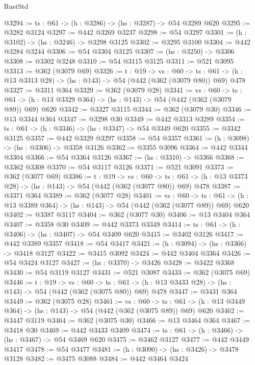 \begin{lexlean}{RustStd}
\begin{coremodule}
@3294 := {ts : @61} -> (h : @3286) -> (hs : @3287) -> @54 @3289 @620
@3295 := @3282 @3124
@3297 := @442 @3269 @3237
@3298 := @54 @3297
@3301 := (h : @3102) -> (hs : @3246) -> @3298 @3125
@3302 := @3295 @3100
@3304 := @442 @3284 @3244
@3306 := @54 @3304 @3125
@3307 := (hs : @3250) -> @3306
@3308 := @3302 @3248
@3310 := @54 @3115 @3125
@3311 := @521 @3095
@3313 := @362 (@3079 @69)
@3326 := {t : @19} ->
  {vs : @60} ->
  {ts : @61} -> (h : @13 @3313 @28) -> (hs : @143) -> @54 (@442 (@362 (@3079 @80)) @69) @478
@3327 := @3311 @364
@3329 := @362 (@3079 @28)
@3341 := {vs : @60} ->
  {ts : @61} -> (h : @13 @3329 @364) -> (hs : @143) -> @54 (@442 (@362 (@3079 @89)) @69) @620
@3342 := @3327 @3115
@3344 := @362 (@3079 @30)
@3346 := @13 @3344 @364
@3347 := @3298 @30
@3349 := @442 @3313 @3289
@3354 := {ts : @61} -> (h : @3346) -> (hs : @3347) -> @54 @3349 @620
@3355 := @3342 @3125
@3357 := @442 @3329 @3297
@3358 := @54 @3357
@3361 := (h : @3098) -> (hs : @3306) -> @3358 @3126
@3362 := @3355 @3096
@3364 := @442 @3344 @3304
@3366 := @54 @3364 @3126
@3367 := (hs : @3310) -> @3366
@3368 := @3362 @3308
@3370 := @54 @3117 @3126
@3371 := @521 @3091
@3373 := @362 (@3077 @69)
@3386 := {t : @19} ->
  {vs : @60} ->
  {ts : @61} -> (h : @13 @3373 @28) -> (hs : @143) -> @54 (@442 (@362 (@3077 @80)) @69) @478
@3387 := @3371 @364
@3389 := @362 (@3077 @28)
@3401 := {vs : @60} ->
  {ts : @61} -> (h : @13 @3389 @364) -> (hs : @143) -> @54 (@442 (@362 (@3077 @89)) @69) @620
@3402 := @3387 @3117
@3404 := @362 (@3077 @30)
@3406 := @13 @3404 @364
@3407 := @3358 @30
@3409 := @442 @3373 @3349
@3414 := {ts : @61} -> (h : @3406) -> (hs : @3407) -> @54 @3409 @620
@3415 := @3402 @3126
@3417 := @442 @3389 @3357
@3418 := @54 @3417
@3421 := (h : @3094) -> (hs : @3366) -> @3418 @3127
@3422 := @3415 @3092
@3424 := @442 @3404 @3364
@3426 := @54 @3424 @3127
@3427 := (hs : @3370) -> @3426
@3428 := @3422 @3368
@3430 := @54 @3119 @3127
@3431 := @521 @3087
@3433 := @362 (@3075 @69)
@3446 := {t : @19} ->
  {vs : @60} ->
  {ts : @61} -> (h : @13 @3433 @28) -> (hs : @143) -> @54 (@442 (@362 (@3075 @80)) @69) @478
@3447 := @3431 @364
@3449 := @362 (@3075 @28)
@3461 := {vs : @60} ->
  {ts : @61} -> (h : @13 @3449 @364) -> (hs : @143) -> @54 (@442 (@362 (@3075 @89)) @69) @620
@3462 := @3447 @3119
@3464 := @362 (@3075 @30)
@3466 := @13 @3464 @364
@3467 := @3418 @30
@3469 := @442 @3433 @3409
@3474 := {ts : @61} -> (h : @3466) -> (hs : @3467) -> @54 @3469 @620
@3475 := @3462 @3127
@3477 := @442 @3449 @3417
@3478 := @54 @3477
@3481 := (h : @3090) -> (hs : @3426) -> @3478 @3128
@3482 := @3475 @3088
@3484 := @442 @3464 @3424

\end{coremodule}
\end{lexlean}
